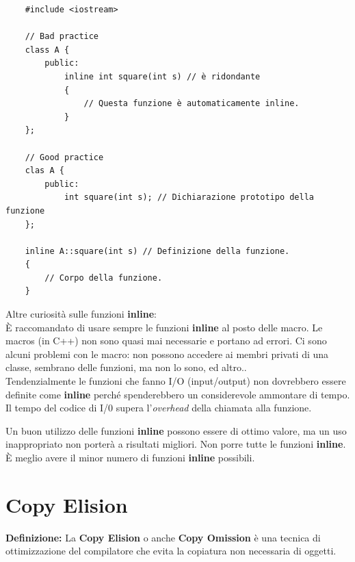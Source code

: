 \begin{lstlisting}
	#include <iostream>
	
	// Bad practice
	class A {
		public:
			inline int square(int s) // è ridondante
			{
				// Questa funzione è automaticamente inline.
			}
	};

	// Good practice
	clas A {
		public:
			int square(int s); // Dichiarazione prototipo della funzione
	};

	inline A::square(int s) // Definizione della funzione.
	{
		// Corpo della funzione.
	}
\end{lstlisting}

\textsf{\small Altre curiosità sulle funzioni \textbf{inline}: } \\

\textsf{\small È raccomandato di usare sempre le funzioni \textbf{inline} al posto delle macro. Le macros (in C++) non sono quasi mai necessarie e portano ad errori. Ci sono alcuni problemi con le macro: non possono accedere ai membri privati di una classe, sembrano delle funzioni, ma non lo sono, ed altro..} \\

\textsf{\small Tendenzialmente le funzioni che fanno I/O (input/output) non dovrebbero essere definite come \textbf{inline} perché spenderebbero un considerevole ammontare di tempo. Il tempo del codice di I/0 supera l'\emph{overhead} della chiamata alla funzione.} \break

\textsf{\small Un buon utilizzo delle funzioni \textbf{inline} possono essere di ottimo valore, ma un uso inappropriato non porterà a risultati migliori. Non porre tutte le funzioni \textbf{inline}. È meglio avere il minor numero di funzioni \textbf{inline} possibili.} \\


\section{Copy Elision}

\textsf{\small \textbf{Definizione: } La \textbf{Copy Elision} o anche \textbf{Copy Omission} è una tecnica di ottimizzazione del compilatore che evita la copiatura non necessaria di oggetti.} \\

